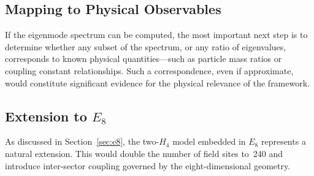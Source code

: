 \documentclass[12pt,a4paper]{article}
\newcommand{\Hfour}{H_4}
\newcommand{\Eeight}{E_8}
\begin{document}
\subsection{Mapping to Physical Observables}

If the eigenmode spectrum can be computed, the most important next step is to
determine whether any subset of the spectrum, or any ratio of eigenvalues,
corresponds to known physical quantities---such as particle mass ratios or
coupling constant relationships.  Such a correspondence, even if approximate,
would constitute significant evidence for the physical relevance of the
framework.

\subsection{Extension to \texorpdfstring{$\Eeight$}{E8}}

As discussed in Section~\ref{sec:e8}, the two-$\Hfour$ model embedded in
$\Eeight$ represents a natural extension.  This would double the number of
field sites to~240 and introduce inter-sector coupling governed by the
eight-dimensional geometry.
\end{document}
